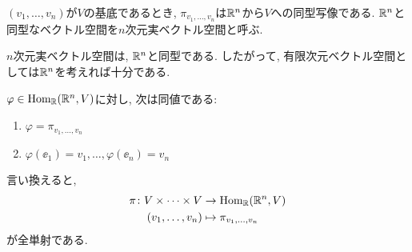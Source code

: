 \begin{remark}
  $(v_1,\ldots,v_n)$が$V$の基底であるとき,
  $\pi_{v_1,\ldots,v_n}$は$\mathbb{R}^n$から$V$への同型写像である.
  $\mathbb{R}^n$と同型なベクトル空間を$n$次元実ベクトル空間と呼ぶ.
\end{remark}

\begin{remark}
  $n$次元実ベクトル空間は,
  $\mathbb{R}^n$と同型である.
  したがって,
  有限次元ベクトル空間としては$\mathbb{R}^n$を考えれば十分である.
\end{remark}
\begin{remark}
  $\varphi \in \operatorname{Hom}_{\mathbb{R}}(\mathbb{R}^n,V)$に対し,
  次は同値である:
  \begin{enumerate}
  \item $\varphi=\pi_{v_1,\ldots,v_n}$
  \item $\varphi(\ee_1)=v_1,\ldots,\varphi(\ee_n)=v_n$
  \end{enumerate}
  言い換えると,
  \begin{align*}
    \pi\colon V\times\cdots \times V &\to \operatorname{Hom}_{\mathbb{R}}(\mathbb{R}^n,V)\\
    (v_1,\ldots,v_n)&\mapsto
    \pi_{v_1,\ldots,v_n}
  \end{align*}
  が全単射である.
\end{remark}

